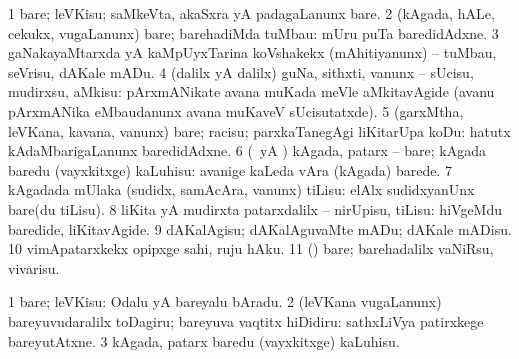 \noindent
\gl{\sakirx}
\bmng
\bnum
\num{1} bare; leVKisu; saMkeVta, akaSxra yA padagaLanunx bare. 
\num{2} (kAgada, hALe, cekukx, \mo vugaLanunx) bare; barehadiMda tuMbau:  mUru puTa baredidAdxne. 
\num{3} gaNakayaMtarxda yA kaMpUyxTarina koVshakekx (mAhitiyanunx) -- tuMbau, seVrisu, dAKale mADu. 
\num{4} (\kaparx dalilx yA \BUkaq dalilx) guNa, sithxti, \mo vanunx -- sUcisu, mudirxsu, aMkisu:  pArxmANikate avana muKada meVle aMkitavAgide (avanu pArxmANika eMbaudanunx avana muKaveV sUcisutatxde). 
\num{5} (garxMtha, leVKana, kavana, \mo vanunx) bare; racisu; parxkaTanegAgi liKitarUpa koDu:  hatutx kAdaMbarigaLanunx baredidAdxne. 
\num{6} (\ame\ yA \AmA) kAgada, patarx -- bare; kAgada baredu (vayxkitxge) kaLuhisu:  avanige kaLeda vAra (kAgada) barede. 
\num{7} kAgadada mUlaka (sudidx, samAcAra, \mo vanunx) tiLisu:  elAlx sudidxyanUnx bare(du tiLisu). 
\num{8} liKita yA mudirxta patarxdalilx -- nirUpisu, tiLisu:  hiVgeMdu baredide, liKitavAgide. 
\num{9} dAKalAgisu; dAKalAguvaMte mADu; dAKale mADisu. 
\num{10} vimApatarxkekx opipxge sahi, ruju hAku. 
\num{11} (\pArxparx) bare; barehadalilx vaNiRsu, vivarisu. 
\enum
\emng

\noindent
\gl{\akirx}
\expl{}
\bmng
\bnum
\num{1} bare; leVKisu:  Odalu yA bareyalu bAradu. 
\num{2} (leVKana \mo vugaLanunx) bareyuvudaralilx toDagiru; bareyuva vaqtitx hiDidiru:  sathxLiVya patirxkege bareyutAtxne. 
\num{3} kAgada, patarx baredu (vayxkitxge) kaLuhisu. 
\enum
\emng


